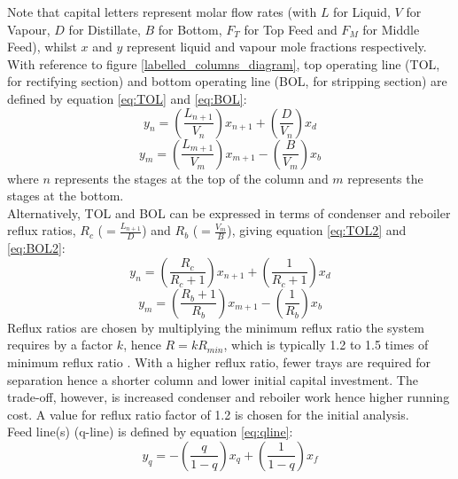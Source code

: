 \documentclass[11pt,oneside]{article}
\begin{document}
        \noindent Note that capital letters represent molar flow rates (with $L$ for Liquid, $V$ for Vapour, $D$ for Distillate, $B$ for Bottom, $F_T$ for Top Feed and $F_M$ for Middle Feed), whilst $x$ and $y$ represent liquid and vapour mole fractions respectively. \\
        With reference to figure \ref{labelled_columns_diagram}, top operating line (TOL, for rectifying section) and bottom operating line (BOL, for stripping section) are defined by equation \ref{eq:TOL} and \ref{eq:BOL}:
        \begin{equation}
            y_n = \left(\frac{L_{n+1}}{V_n}\right)x_{n+1} + \left(\frac{D}{V_n}\right)x_d
            \label{eq:TOL}
        \end{equation}
        \begin{equation}
            y_m = \left(\frac{L_{m+1}}{V_m}\right)x_{m+1} - \left(\frac{B}{V_m}\right)x_b
            \label{eq:BOL}
        \end{equation}
        where $n$ represents the stages at the top of the column and $m$ represents the stages at the bottom. \\
        Alternatively, TOL and BOL can be expressed in terms of condenser and reboiler reflux ratios, $R_c$ ($=\frac{L_{n+1}}{D}$) and $R_b$ ($=\frac{V_m}{B}$), giving equation \ref{eq:TOL2} and \ref{eq:BOL2}: \\
        \begin{equation}
            y_n = \left(\frac{R_c}{R_c+1}\right)x_{n+1} + \left(\frac{1}{R_c+1}\right)x_d
            \label{eq:TOL2}
        \end{equation}
        \begin{equation}
            y_m = \left(\frac{R_b+1}{R_b}\right)x_{m+1} - \left(\frac{1}{R_b}\right)x_b
            \label{eq:BOL2}
        \end{equation}
        Reflux ratios are chosen by multiplying the minimum reflux ratio the system requires by a factor $k$, hence $R=kR_{min}$, which is typically 1.2 to 1.5 times of minimum reflux ratio \citep{treybal2004}. With a higher reflux ratio, fewer trays are required for separation hence a shorter column and lower initial capital investment. The trade-off, however, is increased condenser and reboiler work hence higher running cost. A value for reflux ratio factor of 1.2 is chosen for the initial analysis. \\
        Feed line(s) (q-line) is defined by equation \ref{eq:qline}:
        \begin{equation}
            y_q = -\left(\frac{q}{1-q}\right)x_q + \left(\frac{1}{1-q}\right)x_f
            \label{eq:qline}
        \end{equation}
\end{document}
